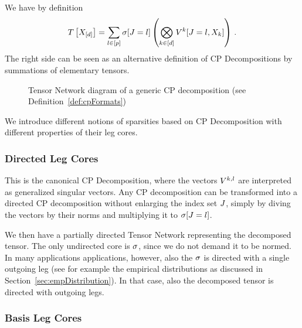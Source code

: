 We have by definition
	\[ T\left[X_{[d]}\right] = \sum_{l\in[p]} \sigma[J=l] \left( \bigotimes_{k\in[d]} V^{k}[J=l,X_{k}] \right) \, . \]
The right side can be seen as an alternative definition of CP Decompositions by summations of elementary tensors.


\begin{figure}[h]
	\begin{center}
		
	\end{center}
	\caption{Tensor Network diagram of a generic CP decomposition (see Definition~\ref{def:cpFormats})}
\end{figure}

We introduce different notions of sparsities based on CP Decomposition with different properties of their leg cores.

\subsubsection{Directed Leg Cores}

This is the canonical CP Decomposition, where the vectors $V^{k,l}$ are interpreted as generalized singular vectors.
Any CP decomposition can be transformed into a directed CP decomposition without enlarging the index set $J$, simply by diving the vectors by their norms and multiplying it to $\sigma[J=l]$.

We then have a partially directed Tensor Network representing the decomposed tensor.
The only undirected core is $\sigma$, since we do not demand it to be normed.
In many applications applications, however, also the $\sigma$ is directed with a single outgoing leg (see for example the empirical distributions as discussed in Section~\ref{sec:empDistribution}).
In that case, also the decomposed tensor is directed with outgoing legs.



\subsubsection{Basis Leg Cores}\label{sec:basisCP}



